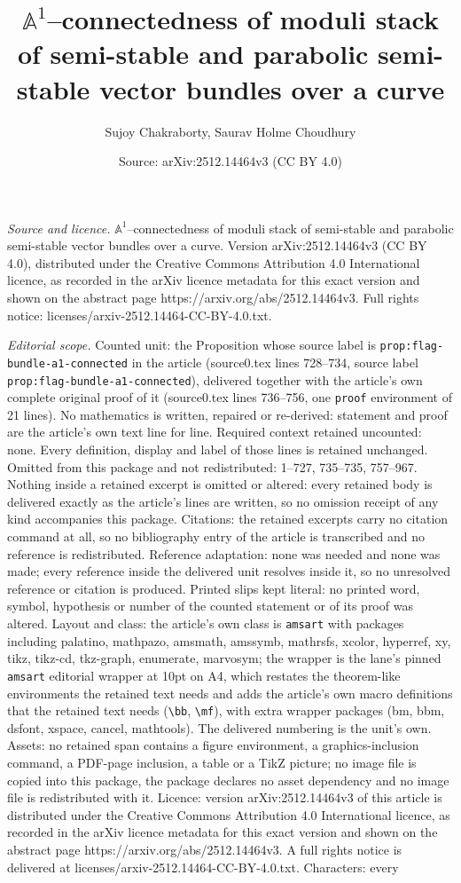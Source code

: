 \documentclass[10pt,a4paper]{amsart}
\title[$\mathbb{A}^1$--connectedness of moduli stack of semi-stable]{$\mathbb{A}^1$--connectedness of moduli stack of semi-stable and parabolic semi-stable vector bundles over a curve}
\author{Sujoy Chakraborty, Saurav Holme Choudhury}
\date{Source: arXiv:2512.14464v3 (CC BY 4.0)}
\begin{document}
\maketitle

\noindent\emph{Source and licence.} $\mathbb{A}^1$--connectedness of moduli stack of semi-stable and parabolic semi-stable vector bundles over a curve. Version arXiv:2512.14464v3 (CC BY 4.0), distributed under the Creative Commons Attribution 4.0 International licence, as recorded in the arXiv licence metadata for this exact version and shown on the abstract page https://arxiv.org/abs/2512.14464v3. Full rights notice: licenses/arxiv-2512.14464-CC-BY-4.0.txt.\par\smallskip

\noindent\textit{Editorial scope.} Counted unit: the Proposition whose source label is \texttt{prop:flag-bundle-a1-connected} in the article (source0.tex lines 728--734, source label \texttt{prop:flag-bundle-a1-connected}), delivered together with the article's own complete original proof of it (source0.tex lines 736--756, one \texttt{proof} environment of 21 lines). No mathematics is written, repaired or re-derived: statement and proof are the article's own text line for line. Required context retained uncounted: none. Every definition, display and label of those lines is retained unchanged. Omitted from this package and not redistributed: 1--727, 735--735, 757--967. Nothing inside a retained excerpt is omitted or altered: every retained body is delivered exactly as the article's lines are written, so no omission receipt of any kind accompanies this package. Citations: the retained excerpts carry no citation command at all, so no bibliography entry of the article is transcribed and no reference is redistributed. Reference adaptation: none was needed and none was made; every reference inside the delivered unit resolves inside it, so no unresolved reference or citation is produced. Printed slips kept literal: no printed word, symbol, hypothesis or number of the counted statement or of its proof was altered. Layout and class: the article's own class is \texttt{amsart} with packages including palatino, mathpazo, amsmath, amssymb, mathrsfs, xcolor, hyperref, xy, tikz, tikz-cd, tkz-graph, enumerate, marvosym; the wrapper is the lane's pinned \texttt{amsart} editorial wrapper at 10pt on A4, which restates the theorem-like environments the retained text needs and adds the article's own macro definitions that the retained text needs (\texttt{\textbackslash bb}, \texttt{\textbackslash mf}), with extra wrapper packages (bm, bbm, dsfont, xspace, cancel, mathtools). The delivered numbering is the unit's own. Assets: no retained span contains a figure environment, a graphics-inclusion command, a PDF-page inclusion, a table or a TikZ picture; no image file is copied into this package, the package declares no asset dependency and no image file is redistributed with it. Licence: version arXiv:2512.14464v3 of this article is distributed under the Creative Commons Attribution 4.0 International licence, as recorded in the arXiv licence metadata for this exact version and shown on the abstract page https://arxiv.org/abs/2512.14464v3. A full rights notice is delivered at licenses/arxiv-2512.14464-CC-BY-4.0.txt. Characters: every 
\end{document}
